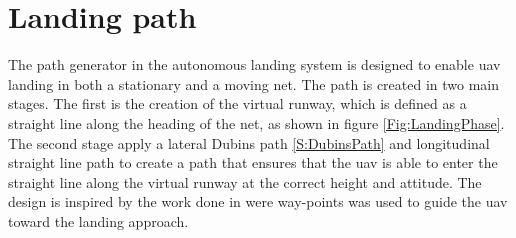 
\chapter{Landing path}\label{Ch:LandingPath}
The path generator in the  autonomous landing system is designed to enable \gls{uav} landing in both a stationary and a moving net. The path is created in two main stages. The first is the creation of the virtual runway, which is defined as a straight line along the heading of the net, as shown in figure \ref{Fig:LandingPhase}. The second stage apply a lateral Dubins path \ref{S:DubinsPath} and longitudinal straight line path to create a path that ensures that the \gls{uav} is able to enter the straight line along the virtual runway at the correct height and attitude. The design is inspired by the work done in \citep{Skulstad&Syversen} were way-points was used to guide the \gls{uav} toward the landing approach.
